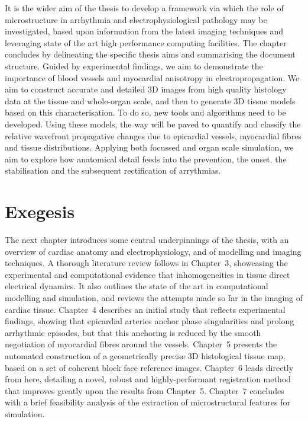 \label{sec:intro:aims}
It is the wider aim of the thesis to develop a framework via which the role of microstructure in arrhythmia and electrophysiological pathology may be investigated, based upon information from the latest imaging techniques and leveraging state of the art high performance computing facilities. The chapter concludes by delineating the specific thesis aims and summarising the document structure. Guided by experimental findings, we aim to demonstrate the importance of blood vessels and myocardial anisotropy in electropropagation. We aim to construct accurate and detailed 3D images from high quality histology data at the tissue and whole-organ scale, and then to generate 3D tissue models based on this characterisation. To do so, new tools and algorithms need to be developed. Using these models, the way will be paved to quantify and classify the relative wavefront propagative changes due to epicardial vessels, myocardial fibres and tissue distributions. Applying both focussed and organ scale simulation, we aim to explore how anatomical detail feeds into the prevention, the onset, the stabilisation and the subsequent rectification of arrythmias.

\section{Exegesis}
\label{sec:intro:exegesis}
  The next chapter introduces some central underpinnings of the thesis, with an overview of cardiac anatomy and electrophysiology, and of modelling and imaging techniques. A thorough literature review follows in Chapter~3, showcasing the experimental and computational evidence that inhomogeneities in tissue direct electrical dynamics. It also outlines the state of the art in computational modelling and simulation, and reviews the attempts made so far in the imaging of cardiac tissue. Chapter~4 describes an initial study that reflects experimental findings, showing that epicardial arteries anchor phase singularities and prolong arrhythmic episodes, but that this anchoring is reduced by the smooth negotiation of myocardial fibres around the vessels. Chapter~5 presents the automated construction of a geometrically precise 3D histological tissue map, based on a set of coherent block face reference images. Chapter~6 leads directly from here, detailing a novel, robust and highly-performant registration method that improves greatly upon the results from Chapter~5. Chapter~7 concludes with a brief feasibility analysis of the extraction of microstructural features for simulation.


